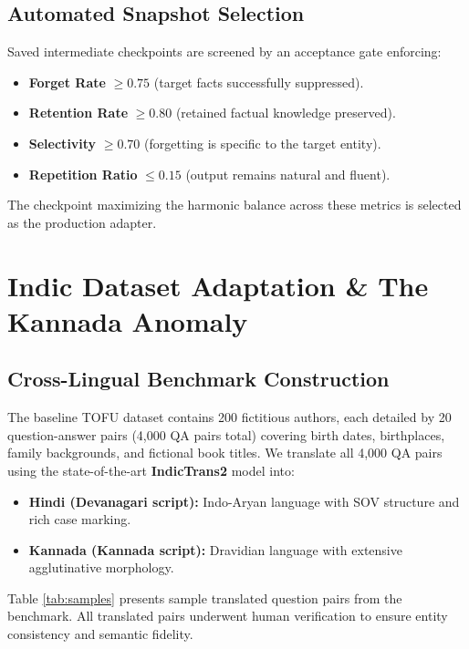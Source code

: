 \documentclass[11pt,a4paper]{article}
\begin{document}
\subsection{Automated Snapshot Selection}
Saved intermediate checkpoints are screened by an acceptance gate enforcing:
\begin{itemize}
    \item \textbf{Forget Rate} $\ge 0.75$ (target facts successfully suppressed).
    \item \textbf{Retention Rate} $\ge 0.80$ (retained factual knowledge preserved).
    \item \textbf{Selectivity} $\ge 0.70$ (forgetting is specific to the target entity).
    \item \textbf{Repetition Ratio} $\le 0.15$ (output remains natural and fluent).
\end{itemize}
The checkpoint maximizing the harmonic balance across these metrics is selected as the production adapter.

\section{Indic Dataset Adaptation \& The Kannada Anomaly}
\label{sec:indic}

\subsection{Cross-Lingual Benchmark Construction}
The baseline TOFU dataset \cite{maini2024} contains 200 fictitious authors, each detailed by 20 question-answer pairs (4,000 QA pairs total) covering birth dates, birthplaces, family backgrounds, and fictional book titles. We translate all 4,000 QA pairs using the state-of-the-art \textbf{IndicTrans2} model \cite{gala2023} into:
\begin{itemize}
    \item \textbf{Hindi (Devanagari script):} Indo-Aryan language with SOV structure and rich case marking.
    \item \textbf{Kannada (Kannada script):} Dravidian language with extensive agglutinative morphology.
\end{itemize}
Table \ref{tab:samples} presents sample translated question pairs from the benchmark. All translated pairs underwent human verification to ensure entity consistency and semantic fidelity.
\end{document}
